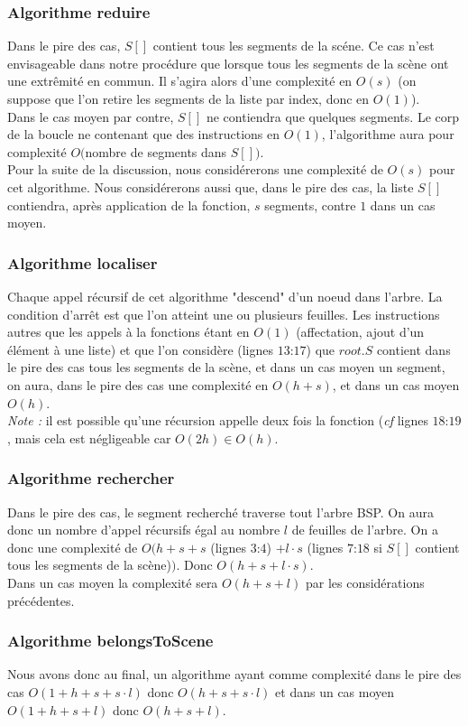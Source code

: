 \documentclass[10pt]{article}
\begin{document}
\subsubsection{Algorithme reduire}
Dans le pire des cas, $S[]$ contient tous les segments de la scéne. Ce cas n'est envisageable dans notre procédure que lorsque tous les segments de la scène ont une extrêmité en commun. Il s'agira alors d'une complexité en $O(s)$ (on suppose que l'on retire les segments de la liste par index, donc en $O(1)$).\\[.5cm]
Dans le cas moyen par contre, $S[]$ ne contiendra que quelques segments. Le corp de la boucle ne contenant que des instructions en $O(1)$, l'algorithme aura pour complexité $O($nombre de segments dans $S[])$.\\[.5cm]
Pour la suite de la discussion, nous considérerons une complexité de $O(s)$ pour cet algorithme. Nous considérerons aussi que, dans le pire des cas, la liste $S[]$ contiendra, après application de la fonction, $s$ segments, contre $1$ dans un cas moyen.
\subsubsection{Algorithme localiser}
Chaque appel récursif de cet algorithme "descend" d'un noeud dans l'arbre. La condition d'arrêt est que l'on atteint une ou plusieurs feuilles. Les instructions autres que les appels à la fonctions étant en $O(1)$ (affectation, ajout d'un élément à une liste) et que l'on considère (lignes $13$:$17$) que $root.S$ contient dans le pire des cas tous les segments de la scène, et dans un cas moyen un segment, on aura, dans le pire des cas une complexité en $O(h+s)$, et dans un cas moyen $O(h)$.\\[.5cm]
\emph{Note : }il est possible qu'une récursion appelle deux fois la fonction (\emph{cf} lignes $18$:$19$, mais cela est négligeable car $O(2h)\in O(h)$.
\subsubsection{Algorithme rechercher}
Dans le pire des cas, le segment recherché traverse tout l'arbre BSP. On aura donc un nombre d'appel récursifs égal au nombre $l$ de feuilles de l'arbre. On a donc une complexité de $O(h+s+s$ (lignes $3$:$4$) $+ l\cdot s$ (lignes $7$:$18$ si $S[]$ contient tous les segments de la scène)$)$. Donc $O(h+s+l\cdot s)$.\\[.5cm]
Dans un cas moyen la complexité sera $O(h+s+l)$ par les considérations précédentes.
\subsubsection{Algorithme belongsToScene}
Nous avons donc au final, un algorithme ayant comme complexité dans le pire des cas $O(1+h+s+s\cdot l)$ donc $O(h+s+s\cdot l)$ et dans un cas moyen $O(1+h+s+l)$ donc $O(h+s+l)$.
\end{document}

